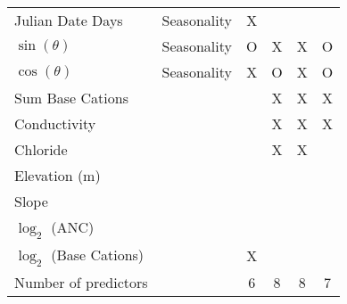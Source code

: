 \begin{table}[htbp]
\begin{tabular}{lccccc}
Julian Date Days           &Seasonality & X                                                     &                                                     &                                                                &  \\ 
$\sin(\theta)$                &Seasonality & O                                                  & X                                                   & X                                                            & O \\ 
$\cos(\theta)$               &Seasonality & X                                                  & O                                                  & X                                                             & O \\ 
Sum Base Cations          &                   &                                                     & X                                                   & X                                                             & X \\ 
Conductivity                  &                   &                                                     & X                                                    & X                                                            & X \\ 
Chloride                         &                   &                                                     & X                                                    & X                                                            &  \\ 
Elevation (m)                  &                  &                                                     &                                                      &                                                                &  \\ 
Slope                               &                 &                                                     &                                                      &                                                                &  \\ 
$\log_2$ (ANC)               &                 &                                                     &                                                      &                                                                &  \\ 
$\log_2$ (Base Cations) &                  & X                                                 &                                                      &                                                                &  \\ \hline\noalign{\smallskip}
Number of predictors      &                 & 6                                                  & 8                                                   & 8                                                            & 7 \\ 
\bottomrule
\end{tabular}
\label{variables}
\end{table}